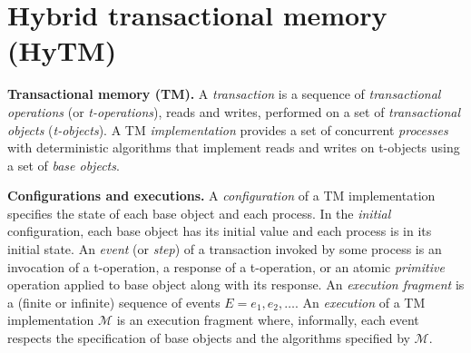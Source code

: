 \section{Hybrid transactional memory (HyTM)}
\label{sec:hytm}
%
\vspace{1mm}\noindent\textbf{Transactional memory (TM).} 
A \emph{transaction} is a sequence of \emph{transactional operations}
(or \emph{t-operations}), reads and writes, performed on a set of \emph{transactional objects} 
(\emph{t-objects}). 
A TM \emph{implementation} provides a set of
concurrent \emph{processes} with deterministic algorithms that implement reads and
writes on t-objects using  a set of \emph{base objects}.

\vspace{1mm}\noindent\textbf{Configurations and executions.} 
A \emph{configuration} of a TM implementation specifies the state of each base object and each process. 
In the \emph{initial} configuration, each base object has its initial value and each process is in its initial state. 
An \emph{event} (or \emph{step}) of a transaction invoked by some process is an invocation of a t-operation, 
a response of a t-operation, or an atomic \emph{primitive} operation applied to base object along with its response. 
An \emph{execution fragment} is a (finite or infinite) sequence of events $E = e_1,e_2,\dots$. 
An \emph{execution} of a TM implementation $\mathcal{M}$ is an
execution fragment where, informally, each event respects the
specification of base objects and the algorithms specified by $\mathcal{M}$.

